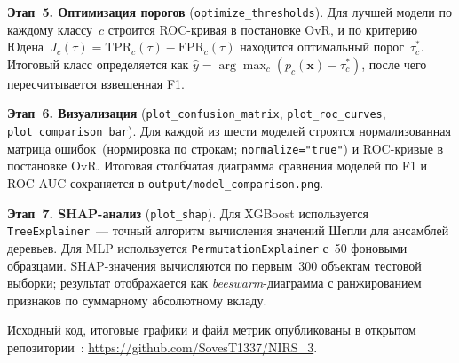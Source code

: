 \textbf{Этап~5. Оптимизация порогов} (\texttt{optimize\_thresholds}). Для лучшей модели по каждому классу~$c$ строится ROC-кривая в постановке OvR, и по критерию Юдена~$J_c(\tau) = \text{TPR}_c(\tau) - \text{FPR}_c(\tau)$ находится оптимальный порог~$\tau_c^*$. Итоговый класс определяется как $\hat{y} = \arg\max_c (p_c(\mathbf{x}) - \tau_c^*)$, после чего пересчитывается взвешенная F1.

\textbf{Этап~6. Визуализация} (\texttt{plot\_confusion\_matrix}, \texttt{plot\_roc\_curves}, \texttt{plot\_comparison\_bar}). Для каждой из шести моделей строятся нормализованная матрица ошибок~(нормировка по строкам; \texttt{normalize="true"}) и ROC-кривые в постановке OvR. Итоговая столбчатая диаграмма сравнения моделей по F1 и ROC-AUC сохраняется в \texttt{output/model\_comparison.png}.

\textbf{Этап~7. SHAP-анализ} (\texttt{plot\_shap}). Для XGBoost используется \texttt{TreeExplainer}~--- точный алгоритм вычисления значений Шепли для ансамблей деревьев. Для MLP используется \texttt{PermutationExplainer} с~50 фоновыми образцами. SHAP-значения вычисляются по первым~300 объектам тестовой выборки; результат отображается как \textit{beeswarm}-диаграмма с ранжированием признаков по суммарному абсолютному вкладу.

Исходный код, итоговые графики и файл метрик опубликованы в открытом репозитории~\cite{github_repo_nirs3}: \url{https://github.com/SovesT1337/NIRS_3}.
